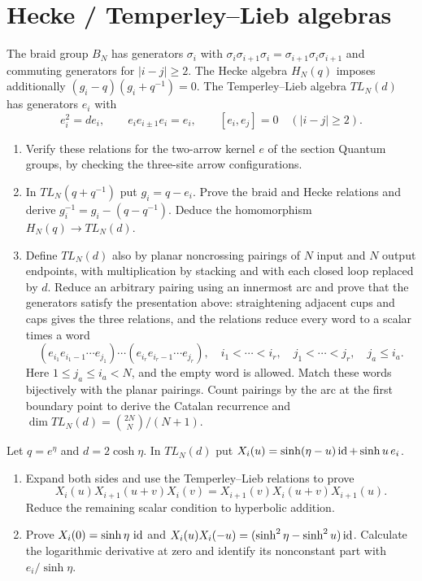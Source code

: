 \section{Hecke / Temperley--Lieb algebras}

\begin{exercise}
The braid group $B_N$ has generators $\sigma_i$ with
$\sigma_i\sigma_{i+1}\sigma_i=\sigma_{i+1}\sigma_i\sigma_{i+1}$
and commuting generators for $|i-j|\ge2$.
The Hecke algebra $H_N(q)$ imposes additionally
$(g_i-q)(g_i+q^{-1})=0$.
The Temperley--Lieb algebra $TL_N(d)$ has generators $e_i$ with
\[
 e_i^2=de_i,\qquad e_ie_{i\pm1}e_i=e_i,\qquad
 [e_i,e_j]=0\quad(|i-j|\ge2).
\]
\begin{enumerate}[label=(\alph*)]
\item Verify these relations for the two-arrow kernel $e$
of the section Quantum groups, by checking the three-site
arrow configurations.
\item In $TL_N(q+q^{-1})$ put $g_i=q-e_i$.
Prove the braid and Hecke relations and derive
$g_i^{-1}=g_i-(q-q^{-1})$. Deduce the homomorphism
$H_N(q)\to TL_N(d)$.
\item Define $TL_N(d)$ also by planar noncrossing pairings
of $N$ input and $N$ output endpoints, with multiplication
by stacking and with each closed loop replaced by $d$.
Reduce an arbitrary pairing using an innermost arc and
prove that the generators satisfy the presentation above:
straightening adjacent cups and caps gives the three relations,
and the relations reduce every word to a scalar times a word
\[
 (e_{i_1}e_{i_1-1}\cdots e_{j_1})\cdots
 (e_{i_r}e_{i_r-1}\cdots e_{j_r}),
 \quad i_1<\cdots<i_r,\quad j_1<\cdots<j_r,\quad j_a\le i_a.
\]
Here $1\le j_a\le i_a<N$, and the empty word is allowed.
Match these words bijectively with the planar pairings.
Count pairings by the arc at the first boundary point to derive
the Catalan recurrence and $\dim TL_N(d)=\binom{2N}{N}/(N+1)$.
\end{enumerate}
\end{exercise}

\begin{exercise}
Let $q=e^\eta$ and $d=2\cosh\eta$. In $TL_N(d)$ put
$X_i(u)=\sinh(\eta-u)\operatorname{id}+\sinh u\,e_i$.
\begin{enumerate}[label=(\alph*)]
\item Expand both sides and use the Temperley--Lieb relations
to prove
\[
 X_i(u)X_{i+1}(u+v)X_i(v)
 =X_{i+1}(v)X_i(u+v)X_{i+1}(u).
\]
Reduce the remaining scalar condition to hyperbolic addition.
\item Prove $X_i(0)=\sinh\eta\,\operatorname{id}$ and
$X_i(u)X_i(-u)=(\sinh^2\eta-\sinh^2u)\operatorname{id}$.
Calculate the logarithmic derivative at zero and identify
its nonconstant part with $e_i/\sinh\eta$.
\end{enumerate}
\end{exercise}

